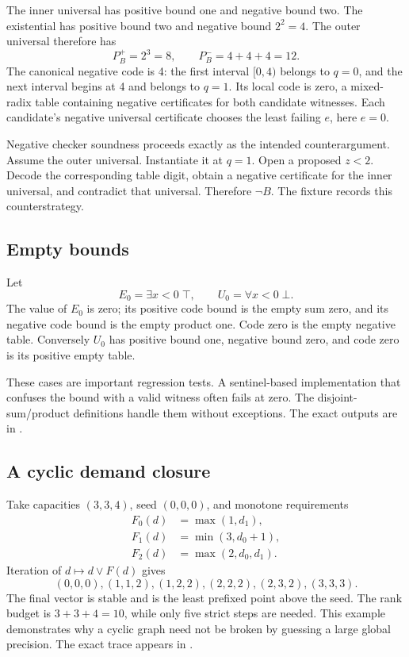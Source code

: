 The inner universal has positive bound one and negative bound two.  The
existential has positive bound two and negative bound \(2^2=4\).  The outer
universal therefore has
\[
 P_B^+=2^3=8,
 \qquad
 P_B^-=4+4+4=12.
\]
The canonical negative code is 4: the first interval \([0,4)\) belongs to
\(q=0\), and the next interval begins at 4 and belongs to \(q=1\).  Its local
code is zero, a mixed-radix table containing negative certificates for both
candidate witnesses.  Each candidate's negative universal certificate chooses
the least failing \(e\), here \(e=0\).

Negative checker soundness proceeds exactly as the intended counterargument.
Assume the outer universal.  Instantiate it at \(q=1\).  Open a proposed
\(z<2\).  Decode the corresponding table digit, obtain a negative certificate
for the inner universal, and contradict that universal.  Therefore \(\neg B\).
The fixture
 records this counterstrategy.

\subsection{Empty bounds}

Let
\[
 E_0=\exists x<0\;\top,
 \qquad
 U_0=\forall x<0\;\bot.
\]
The value of \(E_0\) is zero; its positive code bound is the empty sum zero,
and its negative code bound is the empty product one.  Code zero is the empty
negative table.  Conversely \(U_0\) has positive bound one, negative bound zero,
and code zero is its positive empty table.

These cases are important regression tests.  A sentinel-based implementation
that confuses the bound with a valid witness often fails at zero.  The
disjoint-sum/product definitions handle them without exceptions.  The exact
outputs are in .

\subsection{A cyclic demand closure}

Take capacities \((3,3,4)\), seed \((0,0,0)\), and monotone requirements
\begin{align*}
 F_0(d)&=\max(1,d_1),\\
 F_1(d)&=\min(3,d_0+1),\\
 F_2(d)&=\max(2,d_0,d_1).
\end{align*}
Iteration of \(d\mapsto d\vee F(d)\) gives
\[
 (0,0,0),
 (1,1,2),
 (1,2,2),
 (2,2,2),
 (2,3,2),
 (3,3,3).
\]
The final vector is stable and is the least prefixed point above the seed.  The
rank budget is \(3+3+4=10\), while only five strict steps are needed.  This
example demonstrates why a cyclic graph need not be broken by guessing a large
global precision.  The exact trace appears in
.

